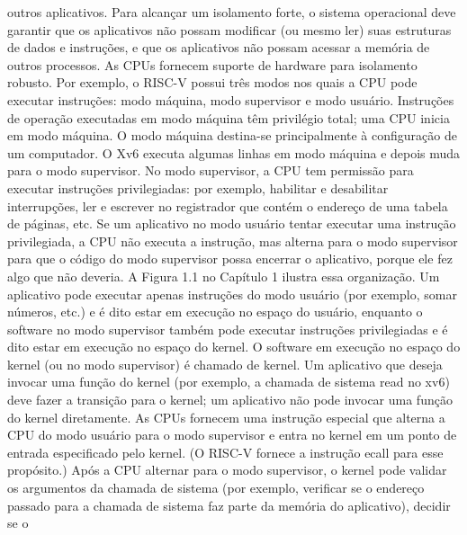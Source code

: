 outros  aplicativos.  Para  alcançar  um  isolamento  forte,  o  sistema  operacional  deve  garantir  que  os  aplicativos  não  
possam  modificar  (ou  mesmo  ler)  suas  estruturas  de  dados  e  instruções,  e  que  os  aplicativos  não  possam  acessar  a  
memória  de  outros  processos.
 As  CPUs  fornecem  suporte  de  hardware  para  isolamento  robusto.  Por  exemplo,  o  RISC-V  possui  três  modos  nos  
quais  a  CPU  pode  executar  instruções:  modo  máquina,  modo  supervisor  e  modo  usuário.  Instruções  de  operação  
executadas  em  modo  máquina  têm  privilégio  total;  uma  CPU  inicia  em  modo  máquina.  O  modo  máquina  destina-se  
principalmente  à  configuração  de  um  computador.  O  Xv6  executa  algumas  linhas  em  modo  máquina  e  depois  muda  
para  o  modo  supervisor.
 No  modo  supervisor,  a  CPU  tem  permissão  para  executar  instruções  privilegiadas:  por  exemplo,  habilitar  e  
desabilitar  interrupções,  ler  e  escrever  no  registrador  que  contém  o  endereço  de  uma  tabela  de  páginas,  etc.  Se  um  
aplicativo  no  modo  usuário  tentar  executar  uma  instrução  privilegiada,  a  CPU  não  executa  a  instrução,  mas  alterna  
para  o  modo  supervisor  para  que  o  código  do  modo  supervisor  possa  encerrar  o  aplicativo,  porque  ele  fez  algo  que  não  
deveria.  A  Figura  1.1  no  Capítulo  1  ilustra  essa  organização.  Um  aplicativo  pode  executar  apenas  instruções  do  modo  
usuário  (por  exemplo,  somar  números,  etc.)  e  é  dito  estar  em  execução  no  espaço  do  usuário,  enquanto  o  software  no  
modo  supervisor  também  pode  executar  instruções  privilegiadas  e  é  dito  estar  em  execução  no  espaço  do  kernel.  O  
software  em  execução  no  espaço  do  kernel  (ou  no  modo  supervisor)  é  chamado  de  kernel.
 Um  aplicativo  que  deseja  invocar  uma  função  do  kernel  (por  exemplo,  a  chamada  de  sistema  read  no  xv6)  deve  
fazer  a  transição  para  o  kernel;  um  aplicativo  não  pode  invocar  uma  função  do  kernel  diretamente.  As  CPUs  fornecem  
uma  instrução  especial  que  alterna  a  CPU  do  modo  usuário  para  o  modo  supervisor  e  entra  no  kernel  em  um  ponto  de  
entrada  especificado  pelo  kernel.  (O  RISC-V  fornece  a  instrução  ecall  para  esse  propósito.)
 Após  a  CPU  alternar  para  o  modo  supervisor,  o  kernel  pode  validar  os  argumentos  da  chamada  de  sistema  (por  
exemplo,  verificar  se  o  endereço  passado  para  a  chamada  de  sistema  faz  parte  da  memória  do  aplicativo),  decidir  se  o  
